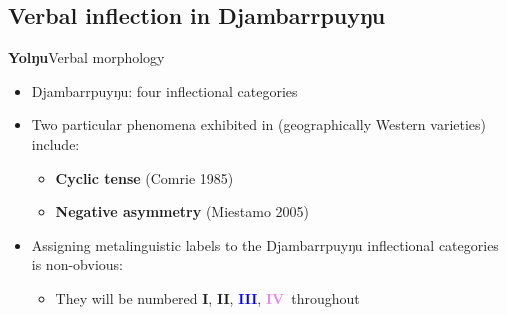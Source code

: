 \documentclass[dvipsnames]{beamer}%
\newcommand{\I}{\textbf{\textcolor{forest}{I}}}
\newcommand{\II}{\textbf{\textcolor{ochre}{II}}}
\newcommand{\III}{\textbf{\textcolor{blue}{III}}}
\newcommand{\IV}{\textbf{\textcolor{violet}{IV}}}
\begin{document}
\subsection{Verbal inflection in Djambarrpuyŋu}
\begin{frame}{\textbf{Yolŋu}\hfill Verbal morphology}
\begin{itemize}
	\item Djambarrpuyŋu: four inflectional categories
	\item Two particular phenomena exhibited in (geographically Western varieties) include:
	\begin{itemize}
		\item \textbf{Cyclic tense} (Comrie 1985)
		\item \textbf{Negative asymmetry} (Miestamo 2005)
	\end{itemize}
	\item Assigning metalinguistic labels to the Djambarrpuyŋu inflectional categories is non-obvious:
	\begin{itemize}
		\item They will be numbered \I, \II, \III, \IV~throughout
	\end{itemize}
\end{itemize}
\end{frame}
\end{document}
